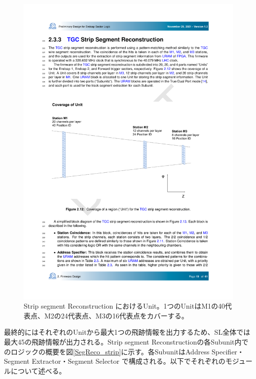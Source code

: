 \begin{figure} 
    \centering
    \includegraphics[width=12cm]{fig/SL/StationCoin_unit_strip.pdf}
    \caption[Strip segment Reconstruction におけるUnit]{Strip segment Reconstruction におけるUnit\cite{SLPDR}。1つのUnitはM1の40代表点、M2の24代表点、M3の16代表点をカバーする。}
    \label{StationCoin_unit_strip}
\end{figure}

最終的にはそれぞれのUnitから最大1つの飛跡情報を出力するため、SL全体では最大45の飛跡情報が出力される。Strip segment Reconstructionの各Subunit内でのロジックの概要を図\ref{SegReco_strip}に示す。各SubunitはAddress Specifier・Segment Extractor・Segment Selector で構成される。以下でそれぞれのモジュールについて述べる。

